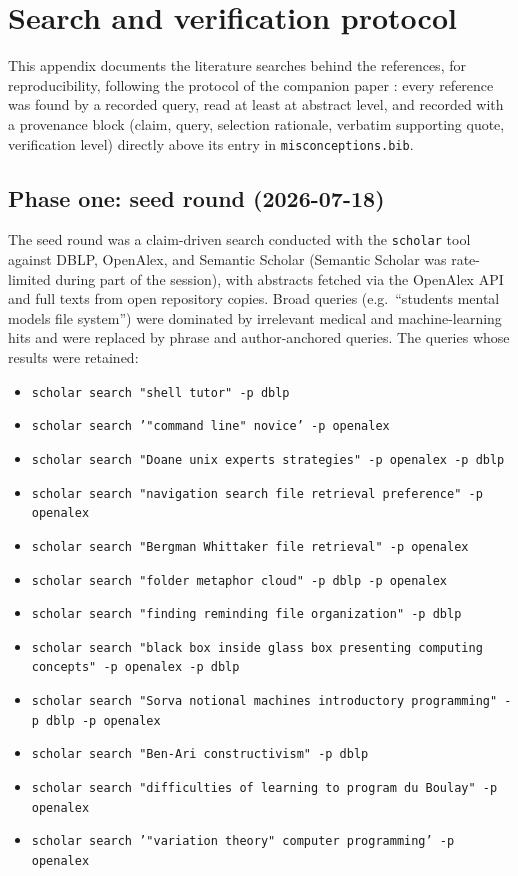 \mode*
\section{Search and verification protocol}
\label{app:protocol}

This appendix documents the literature searches behind the references, for
reproducibility, following the protocol of the companion paper
\autocite[App.~literature protocol]{VTProgMisconceptions}: every reference
was found by a recorded query, read at least at abstract level, and
recorded with a provenance block (claim, query, selection rationale,
verbatim supporting quote, verification level) directly above its entry in
\texttt{misconceptions.bib}.

\subsection{Phase one: seed round (2026-07-18)}

The seed round was a claim-driven search conducted with the
\texttt{scholar} tool against DBLP, OpenAlex, and Semantic Scholar
(Semantic Scholar was rate-limited during part of the session), with
abstracts fetched via the OpenAlex API and full texts from open repository
copies.
Broad queries (e.g.\ \enquote{students mental models file system}) were
dominated by irrelevant medical and machine-learning hits and were replaced
by phrase and author-anchored queries.
The queries whose results were retained:

\begin{itemize}
  \item \texttt{scholar search "shell tutor" -p dblp}
  \item \texttt{scholar search '"command line" novice' -p openalex}
  \item \texttt{scholar search "Doane unix experts strategies" -p openalex -p dblp}
  \item \texttt{scholar search "navigation search file retrieval preference" -p openalex}
  \item \texttt{scholar search "Bergman Whittaker file retrieval" -p openalex}
  \item \texttt{scholar search "folder metaphor cloud" -p dblp -p openalex}
  \item \texttt{scholar search "finding reminding file organization" -p dblp}
  \item \texttt{scholar search "black box inside glass box presenting computing concepts" -p openalex -p dblp}
  \item \texttt{scholar search "Sorva notional machines introductory programming" -p dblp -p openalex}
  \item \texttt{scholar search "Ben-Ari constructivism" -p dblp}
  \item \texttt{scholar search "difficulties of learning to program du Boulay" -p openalex}
  \item \texttt{scholar search '"variation theory" computer programming' -p openalex}
\end{itemize}

